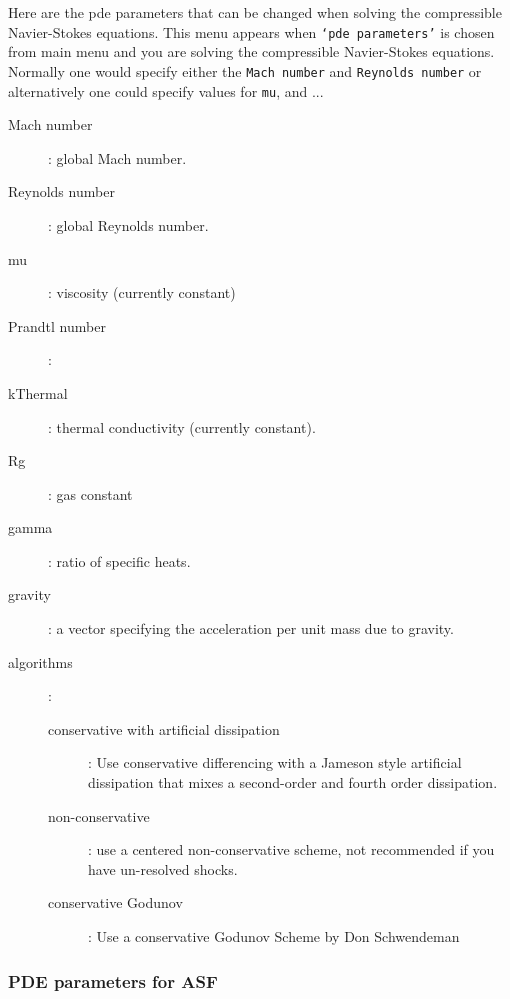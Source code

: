  Here are the pde parameters that can be changed when solving the compressible Navier-Stokes equations.
 This menu appears when {\tt `pde parameters'} is chosen from main menu and you are solving the compressible
 Navier-Stokes equations. Normally one would specify either the {\tt Mach number} and {\tt Reynolds number}
  or alternatively one could specify values for {\tt mu}, and ...
\begin{description}
  \item[Mach number] : global Mach number.
  \item[Reynolds number] : global Reynolds number.
  \item[mu] : viscosity (currently constant)
  \item[Prandtl number] : 
  \item[kThermal] : thermal conductivity (currently constant).
  \item[Rg] : gas constant
  \item[gamma] : ratio of specific heats.
  \item[gravity] : a vector specifying the acceleration per unit mass due to gravity.
  \item[algorithms] :
    \begin{description}
      \item[conservative with artificial dissipation]: Use conservative differencing with a Jameson style
            artificial dissipation that mixes a second-order and fourth order dissipation.
      \item[non-conservative]: use a centered non-conservative scheme, not recommended if you have un-resolved
            shocks.
      \item[conservative Godunov] : Use a conservative Godunov Scheme by Don Schwendeman
    \end{description}
  \end{description}

\subsubsection{PDE parameters for ASF}\label{sec:asfPdeParams}
 

